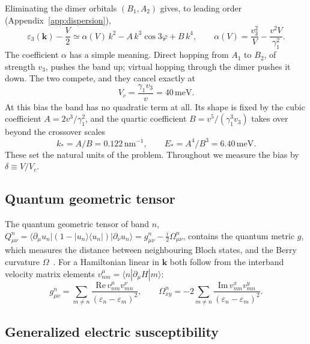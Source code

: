 \documentclass[12pt,a4paper]{article}
\newcommand{\bk}{\mathbf{k}}
\newcommand{\meV}{\,\mathrm{meV}}
\newcommand{\nm}{\,\mathrm{nm}}
\begin{document}
Eliminating the dimer orbitals $(B_1,A_2)$ gives, to leading order (Appendix~\ref{app:dispersion}),
\begin{equation}
\varepsilon_3(\bk)-\frac V2\simeq \alpha(V)\,k^2-A\,k^3\cos3\varphi+B\,k^4,\qquad
\alpha(V)=\frac{v_3^2}{V}-\frac{v^2V}{\gamma_1^2}.
\label{eq:disp}
\end{equation}
The coefficient $\alpha$ has a simple meaning. Direct hopping from $A_1$ to $B_2$, of strength $v_3$, pushes the band up; virtual hopping through the dimer pushes it down. The two compete, and they cancel exactly at
\begin{equation}
V_c=\frac{\gamma_1v_3}{v}=40\meV .
\end{equation}
At this bias the band has no quadratic term at all. Its shape is fixed by the cubic coefficient $A=2v^3/\gamma_1^2$, and the quartic coefficient $B=v^5/(\gamma_1^3v_3)$ takes over beyond the crossover scales
\begin{equation}
k_*=A/B=0.122\nm^{-1},\qquad E_*=A^4/B^3=6.40\meV .
\end{equation}
These set the natural units of the problem. Throughout we measure the bias by $\delta\equiv V/V_c$.

\subsection{Quantum geometric tensor}\label{sec:qgt}

The quantum geometric tensor of band $n$,
$Q^n_{\mu\nu}=\langle\partial_\mu u_n|(1-|u_n\rangle\langle u_n|)|\partial_\nu u_n\rangle=g^n_{\mu\nu}-\tfrac i2\Omega^n_{\mu\nu}$,
contains the quantum metric $g$, which measures the distance between neighbouring Bloch states, and the Berry curvature $\Omega$~\citep{Provost1980}. For a Hamiltonian linear in $\bk$ both follow from the interband velocity matrix elements $v^\mu_{nm}=\langle n|\partial_\mu H|m\rangle$:
\begin{equation}
g^n_{\mu\nu}=\sum_{m\neq n}\frac{\mathrm{Re}\,v^\mu_{nm}v^\nu_{mn}}{(\varepsilon_n-\varepsilon_m)^2},\qquad
\Omega^n_{xy}=-2\sum_{m\neq n}\frac{\mathrm{Im}\,v^x_{nm}v^y_{mn}}{(\varepsilon_n-\varepsilon_m)^2}.
\label{eq:qgt}
\end{equation}

\subsection{Generalized electric susceptibility}\label{sec:ges}
\end{document}

